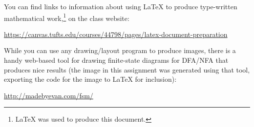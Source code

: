 \documentclass[leqno,11pt]{article}
\begin{document}
\vspace{4pt}\noindent 
You can find links to information about using LaTeX to produce type-written mathematical work,\footnote{LaTeX
was used to produce this document.}  on the class website:
\begin{center}
	\href{https://canvas.tufts.edu/courses/44798/pages/latex-document-preparation}
	{https://canvas.tufts.edu/courses/44798/pages/latex-document-preparation}
\end{center}
While you can use any drawing/layout program to produce images, there is a handy web-based tool for drawing
finite-state diagrams for DFA/NFA that produces nice results (the image in this assignment was generated using
that tool, exporting the code for the image to LaTeX for inclusion):
\begin{center}
	\href{http://madebyevan.com/fsm/}{http://madebyevan.com/fsm/}
\end{center}
 
\end{document}
